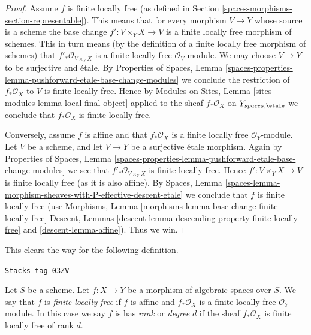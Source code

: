 \begin{proof}
Assume $f$ is finite locally free (as defined in
Section \ref{spaces-morphisms-section-representable}). This means that
for every morphism $V \to Y$ whose source is a scheme the
base change $f' : V \times_Y X \to V$ is a finite locally free morphism
of schemes. This in turn means (by the definition of a finite locally
free morphism of schemes) that
$f'_*\mathcal{O}_{V \times_Y X}$
is a finite locally free $\mathcal{O}_V$-module. We may choose $V \to Y$
to be surjective and \'etale. By
Properties of Spaces,
Lemma \ref{spaces-properties-lemma-pushforward-etale-base-change-modules}
we conclude the restriction of $f_*\mathcal{O}_X$ to $V$ is
finite locally free. Hence by
Modules on Sites, Lemma \ref{sites-modules-lemma-local-final-object}
applied to the sheaf $f_*\mathcal{O}_X$ on $Y_{spaces, \etale}$
we conclude that $f_*\mathcal{O}_X$ is finite locally free.

\medskip\noindent
Conversely, assume $f$ is affine and that $f_*\mathcal{O}_X$ is a finite
locally free $\mathcal{O}_Y$-module. Let $V$ be a scheme, and let
$V \to Y$ be a surjective \'etale morphism. Again by
Properties of Spaces,
Lemma \ref{spaces-properties-lemma-pushforward-etale-base-change-modules}
we see that $f'_*\mathcal{O}_{V \times_Y X}$ is finite locally free.
Hence $f' : V \times_Y X \to V$ is finite locally free (as it is also affine).
By
Spaces,
Lemma \ref{spaces-lemma-morphism-sheaves-with-P-effective-descent-etale}
we conclude that $f$ is finite locally free (use
Morphisms, Lemma \ref{morphisms-lemma-base-change-finite-locally-free}
Descent, Lemmas \ref{descent-lemma-descending-property-finite-locally-free}
and \ref{descent-lemma-affine}). Thus we win.
\end{proof}

This clears the way for the following definition.

\begin{definition}
\label{spaces-morphisms-definition-finite-locally-free}
\href{https://stacks.math.columbia.edu/tag/03ZV}{\texttt{Stacks tag 03ZV}}

Let $S$ be a scheme.
Let $f : X \to Y$ be a morphism of algebraic spaces over $S$.
We say that $f$ is {\it finite locally free} if $f$ is affine
and $f_*\mathcal{O}_X$ is a finite locally free $\mathcal{O}_Y$-module.
In this case we say $f$ is
has {\it rank} or {\it degree} $d$
if the sheaf $f_*\mathcal{O}_X$ is finite locally free of rank $d$.
\end{definition}

